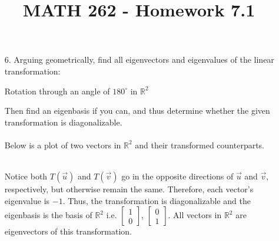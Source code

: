 \documentclass[letterpaper,12pt]{article}
\author{}
\title{MATH 262 - Homework 7.1}
\date{} %
\begin{document}
\maketitle

\begin{enumerate}
  \item[6.]
    Arguing geometrically, find all eigenvectors and eigenvalues of the linear transformation:
    \begin{center}
      Rotation through an angle of $180^\circ$ in $\mathbb{R}^2$
    \end{center}
    Then find an eigenbasis if you can, and thus determine whether the given transformation is diagonalizable. \\
    \\
    Below is a plot of two vectors in $\mathbb{R}^2$ and their transformed counterparts. \\
     \\
    Notice both $T(\vec{u})$ and $T(\vec{v})$ go in the opposite directions of $\vec{u}$ and $\vec{v}$, respectively, but otherwise remain the same. Therefore, each vector's eigenvalue is $-1$. Thus, the transformation is diagonalizable and the eigenbasis is the basis of $\mathbb{R}^2$ i.e. $\begin{bmatrix}1 \\ 0\end{bmatrix}$, $\begin{bmatrix}0 \\ 1\end{bmatrix}$. All vectors in $\mathbb{R}^2$ are eigenvectors of this transformation.
\end{enumerate}
\end{document}
